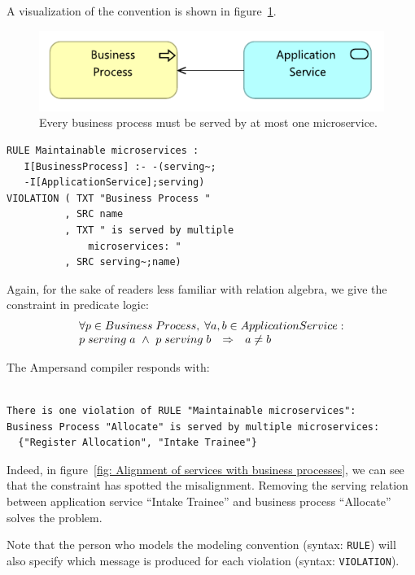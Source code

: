 \documentclass[sn-vancouver]{sn-jnl}%
\theoremstyle{thmstyleone}%
\theoremstyle{thmstyletwo}%
\theoremstyle{thmstylethree}%
\begin{document}
A visualization of the convention is shown in figure~\ref{MC1}.

\begin{figure}[hbtp]
\centering
\includegraphics[clip=true, scale=0.7]{MC1}
\caption{\small{Every business process must be served by at most one microservice.}}
\label{MC1}
\end{figure}

{\small
\begin{lstlisting}[frame=single, label={mc1}, caption={Every business process must be served by at most one microservice.}]
RULE Maintainable microservices :
   I[BusinessProcess] :- -(serving~;
   -I[ApplicationService];serving)
VIOLATION ( TXT "Business Process "
          , SRC name
          , TXT " is served by multiple 
              microservices: "
          , SRC serving~;name)
\end{lstlisting}
}
Again, for the sake of readers less familiar with relation algebra, we give the constraint in predicate logic:
\[\begin{array}{rcl}
   \multicolumn{3}{l}{\forall p \in Business\;Process, \;\forall a,b\in Application Service:}\\
   p \;serving \;a\ \wedge\ p \;serving \;b&\Rightarrow&a\not =b
\end{array}\]

The Ampersand compiler responds with:

{\small
\begin{verbatim}

There is one violation of RULE "Maintainable microservices":
Business Process "Allocate" is served by multiple microservices:
  {"Register Allocation", "Intake Trainee"}

\end{verbatim}
}

Indeed, in figure~\ref{fig: Alignment of services with business processes},
we can see that the constraint has spotted the misalignment.
Removing the serving relation between application service ``Intake Trainee'' and business process ``Allocate'' solves the problem.

Note that the person who models the modeling convention (syntax: \verb#RULE#) will also specify which message is produced for each violation (syntax: \verb#VIOLATION#).
\end{document}
